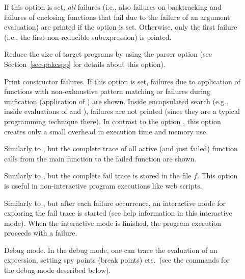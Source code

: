 \begin{description}
\item[]
If this option is set, \emph{all} failures
(i.e., also failures on backtracking and failures
of enclosing functions that fail due to the failure of an argument
evaluation) are printed if the option  is set.
Otherwise, only the first failure (i.e., the first non-reducible
subexpression) is printed.

\item[]
Reduce the size of target programs by using the
parser option 
(see Section~\ref{sec-pakcspp} for details about this option).

\item[] Print constructor failures.
If this option is set, failures due to application of
functions with non-exhaustive pattern matching or failures
during unification (application of \ccode{=:=}) are shown.
Inside encapsulated search (e.g., inside evaluations of
 and ), failures are not printed
(since they are a typical programming technique there).
In contrast to the option ,
this option creates only a small overhead in execution time
and memory use.

\item[]
Similarly to , but the complete trace
of all active (and just failed) function calls from the main function
to the failed function are shown.

\item[]
Similarly to , but the complete fail trace
is stored in the file $f$. This option is useful in non-interactive
program executions like web scripts.

\item[]
Similarly to , but after each failure occurrence,
an interactive mode for exploring the fail trace is started
(see help information in this interactive mode).
When the interactive mode is finished, the program execution
proceeds with a failure.

\item[] Debug mode.
In the debug mode, one can trace the evaluation of an expression,
setting spy points (break points) etc.\ (see the commands
for the debug mode described below).


\end{description}
